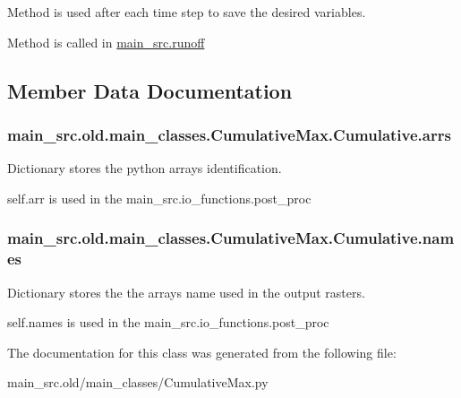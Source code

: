 Method is used after each time step to save the desired variables. 

Method is called in \hyperlink{namespacemain__src_1_1runoff}{main\-\_\-src.\-runoff} 

\subsection{Member Data Documentation}
\hypertarget{classmain__src_8old_1_1main__classes_1_1CumulativeMax_1_1Cumulative_a5ef0313ad1d0bfc60a4d550e7dd0e0e9}{
\subsubsection[{arrs}]{\setlength{\rightskip}{0pt plus 5cm}main\-\_\-src.\-old.\-main\-\_\-classes.\-Cumulative\-Max.\-Cumulative.\-arrs}}\label{classmain__src_8old_1_1main__classes_1_1CumulativeMax_1_1Cumulative_a5ef0313ad1d0bfc60a4d550e7dd0e0e9}


Dictionary stores the python arrays identification. 

self.\-arr is used in the main\-\_\-src.\-io\-\_\-functions.\-post\-\_\-proc \hypertarget{classmain__src_8old_1_1main__classes_1_1CumulativeMax_1_1Cumulative_a57e0db8fc9c269bf87c026b3a9dc3fb3}{
\subsubsection[{names}]{\setlength{\rightskip}{0pt plus 5cm}main\-\_\-src.\-old.\-main\-\_\-classes.\-Cumulative\-Max.\-Cumulative.\-names}}\label{classmain__src_8old_1_1main__classes_1_1CumulativeMax_1_1Cumulative_a57e0db8fc9c269bf87c026b3a9dc3fb3}


Dictionary stores the the arrays name used in the output rasters. 

self.\-names is used in the main\-\_\-src.\-io\-\_\-functions.\-post\-\_\-proc 

The documentation for this class was generated from the following file\-:\begin{DoxyCompactItemize}
\item 
main\-\_\-src.\-old/main\-\_\-classes/Cumulative\-Max.\-py\end{DoxyCompactItemize}
